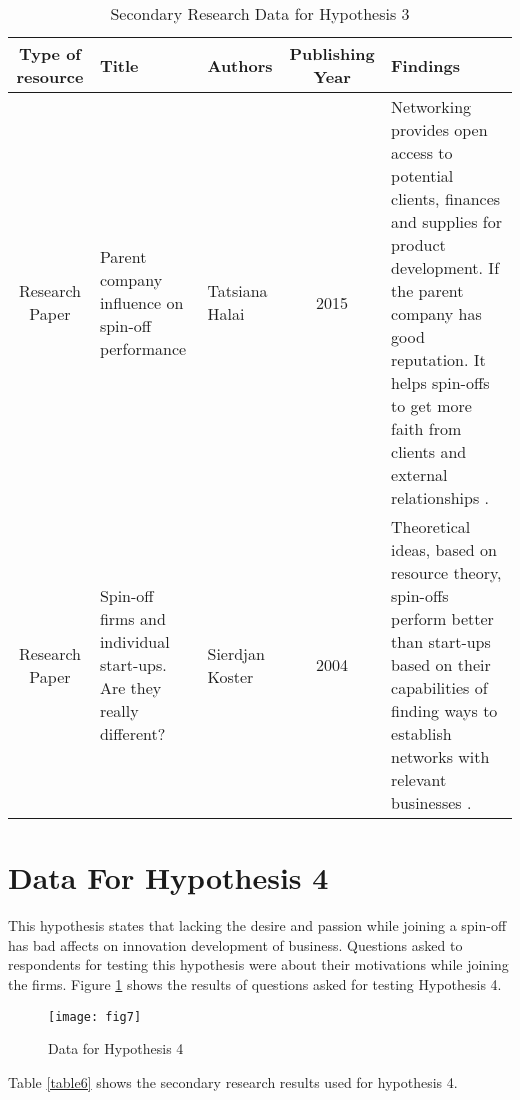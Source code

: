 \begin{table} [h!]
	\centering
	\begin{tabular}{ |c|L{3cm}|L{3cm}|c|L{3cm}| } 
		\hline
		\textbf{Type of resource} & \textbf{Title} & \textbf{Authors} & \textbf{Publishing Year} & \textbf{Findings} \\
		\hline
		Research Paper &Parent company 
		influence
		on
		spin-off
		performance & Tatsiana Halai & 2015 & Networking provides open
		access to potential clients,
		finances and supplies for
		product development. If the
		parent company has good
		reputation. It helps spin-offs to
		get more faith from clients
		and external relationships \cite{58}.\\
		\hline
		Research Paper & Spin-off
		firms
		and
		individual
		start-ups.
		Are
		they really
		different? &  Sierdjan Koster & 2004 & Theoretical ideas, based on
		resource theory, spin-offs
		perform better than start-ups
		based on their capabilities of
		finding ways to establish
		networks
		with
		relevant
		businesses \cite{30}. \\
		\hline
	\end{tabular}
	\caption{Secondary Research Data for Hypothesis 3}
	\label{table5}
\end{table}
\section{Data For Hypothesis 4\label{sec:data4}}
This hypothesis states that lacking the desire and passion while joining a spin-off has bad affects on
innovation development of business. Questions asked to respondents for testing this hypothesis
were about their motivations while joining the firms. Figure \ref{fig7} shows the results of
questions asked for testing Hypothesis 4.

\begin{figure}[!h]
	\centering
	\texttt{[image: fig7]}
	\caption{Data for Hypothesis 4}
	\label{fig7}
\end{figure}
Table \ref{table6} shows the secondary research results used for hypothesis 4.

